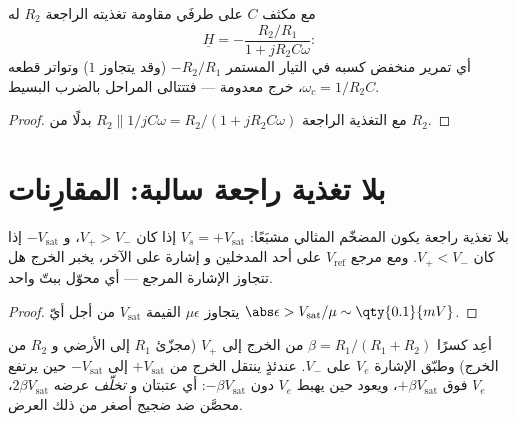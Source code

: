 \begin{proposition}\label{prop:b1:operational-amplifier:activelp}
 مع مكثف $C$ على طرفَي مقاومة تغذيته
الراجعة $R_2$ له
\[
\underline H = -\frac{R_2/R_1}{1 + jR_2C\omega}:
\]
أي تمرير منخفض كسبه في التيار المستمر $-R_2/R_1$ (وقد يتجاوز $1$) وتواتر قطعه
$\omega_c = 1/R_2C$،  خرج معدومة --- فتتتالى المراحل بالضرب
البسيط.
\end{proposition}

\begin{proof}
 مع  التغذية الراجعة $R_2 \parallel 1/jC\omega
= R_2/(1 + jR_2C\omega)$ بدلًا من $R_2$.
\end{proof}

\section{بلا تغذية راجعة سالبة: المقارِنات}

\begin{proposition}[المقارِن]\label{prop:b1:operational-amplifier:comparator}
بلا تغذية راجعة يكون المضخّم المثالي مشبَعًا:
$V_s = +V_{\mathrm{sat}}$ إذا كان $V_+ > V_-$، و $-V_{\mathrm{sat}}$ إذا كان
$V_+ < V_-$. ومع مرجع $V_{\mathrm{ref}}$ على أحد المدخلين و
إشارة على الآخر، يخبر الخرج هل تتجاوز الإشارة
المرجع --- أي محوّل ببتّ واحد.
\end{proposition}

\begin{proof}
يتجاوز $\mu\epsilon$ القيمة $V_{\mathrm{sat}}$ من أجل أيّ $\abs\epsilon >
V_{\mathrm{sat}}/\mu \sim \qty{0.1}{mV}$.
\end{proof}

\begin{proposition}\label{prop:b1:operational-amplifier:schmitt}
أعِد كسرًا $\beta = R_1/(R_1 + R_2)$ من الخرج إلى $V_+$
(مجزّئ $R_1$ إلى الأرضي و $R_2$ من الخرج) وطبّق الإشارة
$V_e$ على $V_-$. عندئذٍ ينتقل الخرج من $+V_{\mathrm{sat}}$ إلى
$-V_{\mathrm{sat}}$ حين يرتفع $V_e$ فوق $+\beta V_{\mathrm{sat}}$، ويعود
حين يهبط $V_e$ دون $-\beta V_{\mathrm{sat}}$: أي عتبتان و
\emph{تخلّف} عرضه $2\beta V_{\mathrm{sat}}$، محصَّن ضد ضجيج
أصغر من ذلك العرض.
\end{proposition}

